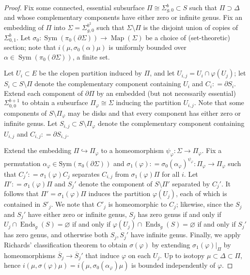 \documentclass[twoside]{amsart}
\theoremstyle{plain}
\theoremstyle{break}
\theoremstyle{definition}
\theoremstyle{remark}
\newcommand{\dfn}{\mathrel{\mathop:}=}
\DeclareMathOperator{\Map}{Map}
\DeclareMathOperator{\Ends}{Ends}
\begin{document}
\begin{proof}
  Fix some connected, essential subsurface $\Pi \cong
  \Sigma^b_{g,0} \subset S$ such that $\Pi \supset
  \Delta$ and whose complementary components have either zero or
  infinite genus.
  Fix an embedding of $\Pi$
  into $\Sigma = \Sigma_{g,0}^{b^2}$ such that $\Sigma
  \setminus \Pi$ is the disjoint union of copies of
  $\Sigma^b_{0,1}$.  Let $\sigma_0 :
  \operatorname{Sym}(\pi_0(\partial \Sigma)) \to \Map(\Sigma)$ be a
  choice of (set-theoretic) section; note that $i(\mu,\sigma_0(\alpha)\mu)$ is
  uniformly bounded over $\alpha \in
  \operatorname{Sym}(\pi_0(\partial \Sigma))$, a finite set. 

  Let $U_i \subset E$ be the clopen partition induced by $\Pi$,
  and let $U_{i,j} = U_i \cap \varphi(U_j)$; let $S_i \subset
  S\setminus \Pi$ denote the complementary component containing $U_i$ and $C_i\dfn 
  \partial S_i$. Extend each component
  of $\partial \Pi$ by an embedded (but not necessarily
  essential) $\Sigma^{b+1}_{0,0}$ to obtain a subsurface
  $\Pi_\varphi \cong \Sigma$ inducing the partition $U_{i,j}$. Note that some
  components of $S \setminus \Pi_\varphi$ may be disks and that
  every component has either zero or infinite genus.  Let
  $S_{i,j} \subset S \setminus \Pi_\varphi$ denote the complementary 
  component containing $U_{i,j}$ and $C_{i,j} \dfn \partial S_{i,j}$. 

  Extend the embedding $\Pi \hookrightarrow \Pi_\varphi$ to a
  homeomorphism $\psi_\varphi : \Sigma \to \Pi_\varphi$.  Fix a
  permutation $\alpha_\varphi \in \text{Sym}(\pi_0(\partial
  \Sigma))$ and $\sigma_1(\varphi) \dfn
  \sigma_0(\alpha_\varphi)^{\psi_\varphi} : \Pi_\varphi \to
  \Pi_\varphi$
  such that $C_j' \dfn \sigma_1(\varphi)C_j$ separates $C_{i,j}$ from
  $\sigma_1(\varphi)\Pi$ for all $i$.   Let $\Pi' \dfn \sigma_1(\varphi)\Pi$ and $S_j'$ denote the component of $S \setminus \Pi'$ separated by $C_j'$.
  It follows that $\Pi' = \sigma_1(\varphi)\Pi$ induces the partition
  $\varphi(U_j)$, each of which is contained in $S'_j$. We note that
  $C'_j$ is homeomorphic to $C_j$; likewise, since the $S_j$ and
  $S_j'$ have either zero or infinite genus, $S_j$ has zero
  genus if and only if $U_j \cap \Ends_g(S) = \varnothing$ if and
  only if $\varphi(U_j) \cap \Ends_g(S) = \varnothing$ if and only
  if $S_j'$ has zero genus, and otherwise both $S_j,S_j'$ have infinite genus.
  Finally, we apply Richards' classification theorem \cite{richards} to 
  obtain $\sigma(\varphi)$ by extending
  $\sigma_1(\varphi)|_\Pi$ by homeomorphisms $\overline S_j \to
  \overline S_{j}'$
   that induce $\varphi$ on each $U_j$.  Up to isotopy $\mu \subset
   \Delta \subset \Pi$, hence
  $i(\mu,\sigma(\varphi)\mu) =
  i(\mu,\sigma_0(\alpha_\varphi)\mu)$
  is bounded
  independently of $\varphi$.
\end{proof}
\end{document}
